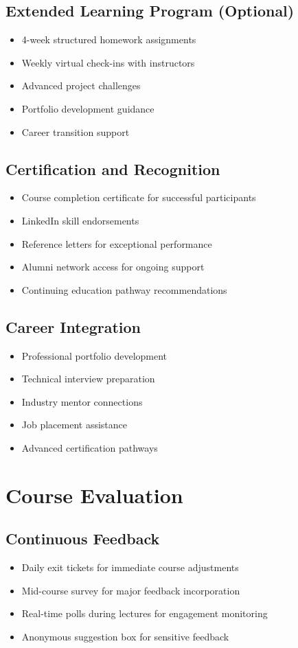 \documentclass[11pt,a4paper]{article}
\begin{document}
\subsection{Extended Learning Program (Optional)}
\begin{itemize}
    \item 4-week structured homework assignments
    \item Weekly virtual check-ins with instructors
    \item Advanced project challenges
    \item Portfolio development guidance
    \item Career transition support
\end{itemize}

\subsection{Certification and Recognition}
\begin{itemize}
    \item Course completion certificate for successful participants
    \item LinkedIn skill endorsements
    \item Reference letters for exceptional performance
    \item Alumni network access for ongoing support
    \item Continuing education pathway recommendations
\end{itemize}

\subsection{Career Integration}
\begin{itemize}
    \item Professional portfolio development
    \item Technical interview preparation
    \item Industry mentor connections
    \item Job placement assistance
    \item Advanced certification pathways
\end{itemize}

\section{Course Evaluation}

\subsection{Continuous Feedback}
\begin{itemize}
    \item Daily exit tickets for immediate course adjustments
    \item Mid-course survey for major feedback incorporation
    \item Real-time polls during lectures for engagement monitoring
    \item Anonymous suggestion box for sensitive feedback
\end{itemize}
\end{document}
